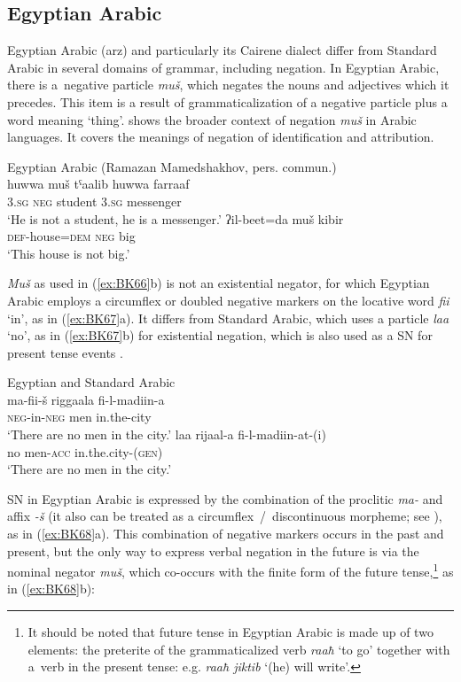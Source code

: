 \documentclass[output=paper]{langsci/langscibook}
\begin{document}
\subsection{Egyptian Arabic}\label{sec:BK4.3}

Egyptian Arabic (arz) and particularly its Cairene dialect differ from Standard Arabic in several domains of grammar, including negation. In Egyptian Arabic, there is a negative particle \textit{muš}, which negates the nouns and adjectives which it precedes. This item is a result of grammaticalization of a negative particle plus a word meaning ‘thing’. \citet{wilmsen-a} shows the broader context of negation \textit{muš} in Arabic languages. It covers the meanings of negation of identification and attribution.

\ea Egyptian Arabic (Ramazan Mamedshakhov, pers. commun.) \label{ex:BK66}\\
  \ea
	\gll huwwa	muš	tˤaalib	huwwa	farraaf\\
	\textsc{3.sg}		\textsc{neg}	student	\textsc{3.sg}		messenger\\
	\glt `He is not a student, he is a messenger.'
  \ex
	\gll ʔil-beet=da			muš	kibir\\
	\textsc{def}-house=\textsc{dem}	\textsc{neg}	big\\
	\glt `This house is not big.'
\z \z

\textit{Muš} as used in (\ref{ex:BK66}b) is not an existential negator, for which Egyptian Arabic employs a circumflex or doubled negative markers on the locative word \textit{fii} ‘in’, as in (\ref{ex:BK67}a). It differs from Standard Arabic, which uses a particle \textit{laa} ‘no’, as in (\ref{ex:BK67}b) for existential negation, which is also used as a SN for present tense events \citep[232]{gadalla2000a}.

\ea Egyptian and Standard Arabic \citep[234]{gadalla2000a} \label{ex:BK67}\\
  \ea
	\gll ma-fii-š		riggaala		fi-l-madiin-a\\
	\textsc{neg}-in-\textsc{neg}	men			in.the-city\\
	\glt `There are no men in the city.'
  \ex
	\gll laa	rijaal-a		fi-l-madiin-at-(i)\\
	no		men-\textsc{acc}	in.the.city-(\textsc{gen})\\
	\glt `There are no men in the city.'
\z \z

SN in Egyptian Arabic is expressed by the combination of the proclitic \textit{ma-} and affix \textit{-š} (it also can be treated as a circumflex / discontinuous morpheme; see \citealp[234]{gadalla2000a}), as in (\ref{ex:BK68}a). This combination of negative markers occurs in the past and present, but the only way to express verbal negation in the future is via the nominal negator \textit{muš}, which co-occurs with the finite form of the future tense,\footnote{It should be noted that future tense in Egyptian Arabic is made up of two elements: the preterite of the grammaticalized verb \textit{raaħ} ‘to go’ together with a verb in the present tense: e.g. \textit{raaħ jiktib} ‘(he) will write’.} as in (\ref{ex:BK68}b):
\end{document}
